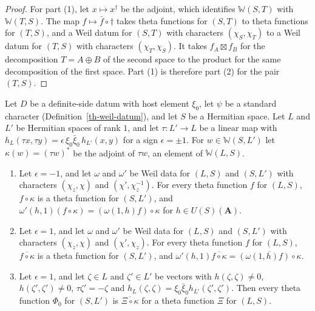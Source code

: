 \begin{proof}
For part (1), let $x\mapsto x^\dagger$ be the adjoint, which identifies
$\mathbb W(S,T)$ with $\mathbb W(T,S)$. The map $f\mapsto\bar f\circ\dagger$
takes theta functions for $(S,T)$ to theta functions for $(T,S)$, and a Weil
datum for $(S,T)$ with characters $(\chi_S,\chi_T)$ to a Weil datum for
$(T,S)$ with characters $(\chi_T,\chi_S)$. It takes $f_A\boxtimes f_B$ for the
decomposition $T=A\oplus B$ of the second space to the product for the same
decomposition of the first space. Part (1) is therefore part (2) for the pair
$(T,S)$.
\end{proof}

\begin{lemma}\label{th-line-comparison}
Let $D$ be a definite-side datum with host element $\xi_0$, let $\psi$ be a
standard character (Definition~\ref{th-weil-datum}), and let $S$ be a Hermitian
space. Let $L$ and $L'$ be Hermitian spaces of rank $1$, and let
$\tau\colon L'\to L$ be a linear map with
$h_L(\tau x,\tau y)=\epsilon\,\xi_0\bar\xi_0\,h_{L'}(x,y)$ for a sign
$\epsilon=\pm1$. For $w\in\mathbb W(S,L')$ let $\kappa(w)=(\tau w)^*$ be the
adjoint of $\tau w$, an element of $\mathbb W(L,S)$.
\begin{enumerate}
\item Let $\epsilon=-1$, and let $\omega$ and $\omega'$ be Weil data for
  $(L,S)$ and $(S,L')$ with characters $(\chi_z,\chi)$ and
  $(\chi',\chi_z^{-1})$. For every theta function $f$ for $(L,S)$, $f\circ\kappa$
  is a theta function for $(S,L')$, and
  $\omega'(h,1)(f\circ\kappa)=(\omega(1,h)f)\circ\kappa$ for
  $h\in U(S)(\mathbf A)$.
\item Let $\epsilon=1$, and let $\omega$ and $\omega'$ be Weil data for
  $(L,S)$ and $(S,L')$ with characters $(\chi_z,\chi)$ and $(\chi',\chi_z)$.
  For every theta function $f$ for $(L,S)$, $\overline{f\circ\kappa}$ is a theta
  function for $(S,L')$, and
  $\omega'(h,1)\overline{f\circ\kappa}=\overline{(\omega(1,h)f)\circ\kappa}$.
\item Let $\epsilon=1$, and let $\zeta\in L$ and $\zeta'\in L'$ be vectors with
  $h(\zeta,\zeta)\neq0$, $h(\zeta',\zeta')\neq0$, $\tau\zeta'=-\zeta$ and
  $h_L(\zeta,\zeta)=\xi_0\bar\xi_0h_{L'}(\zeta',\zeta')$. Then every theta
  function $\Phi_0$ for $(S,L')$ is $\overline{\Xi\circ\kappa}$ for a theta
  function $\Xi$ for $(L,S)$.
\end{enumerate}
\end{lemma}
